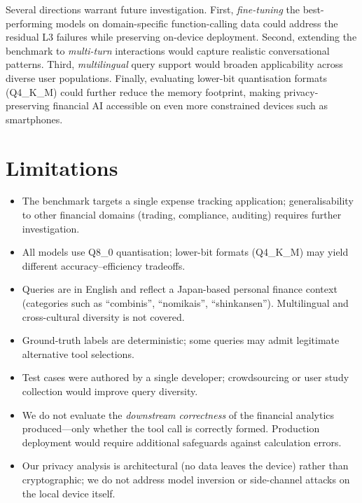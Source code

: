 \documentclass[11pt,twocolumn]{article}
\begin{document}
Several directions warrant future investigation.
First, \emph{fine-tuning} the best-performing models on domain-specific function-calling data could address the residual L3 failures while preserving on-device deployment.
Second, extending the benchmark to \emph{multi-turn} interactions would capture realistic conversational patterns.
Third, \emph{multilingual} query support would broaden applicability across diverse user populations.
Finally, evaluating lower-bit quantisation formats (Q4\_K\_M) could further reduce the memory footprint, making privacy-preserving financial AI accessible on even more constrained devices such as smartphones.

\section*{Limitations}

\begin{itemize}
    \item The benchmark targets a single expense tracking application; generalisability to other financial domains (trading, compliance, auditing) requires further investigation.
    \item All models use Q8\_0 quantisation; lower-bit formats (Q4\_K\_M) may yield different accuracy--efficiency tradeoffs.
    \item Queries are in English and reflect a Japan-based personal finance context (categories such as ``combinis'', ``nomikais'', ``shinkansen''). Multilingual and cross-cultural diversity is not covered.
    \item Ground-truth labels are deterministic; some queries may admit legitimate alternative tool selections.
    \item Test cases were authored by a single developer; crowdsourcing or user study collection would improve query diversity.
    \item We do not evaluate the \emph{downstream correctness} of the financial analytics produced---only whether the tool call is correctly formed. Production deployment would require additional safeguards against calculation errors.
    \item Our privacy analysis is architectural (no data leaves the device) rather than cryptographic; we do not address model inversion or side-channel attacks on the local device itself.
\end{itemize}
\end{document}
